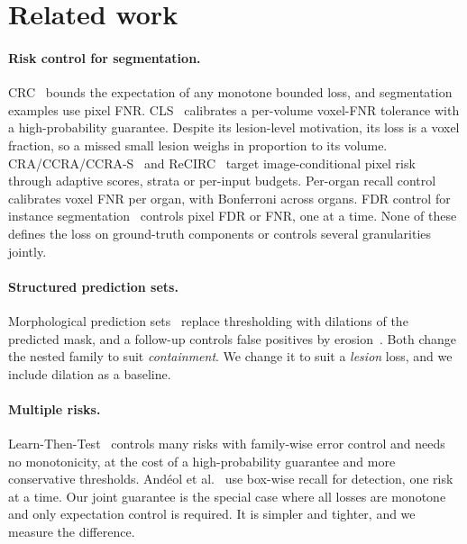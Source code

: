 \section{Related work}

\paragraph{Risk control for segmentation.}
CRC~\cite{angelopoulos2024crc} bounds the expectation of any monotone bounded
loss, and segmentation examples use pixel FNR. CLS~\cite{tan2025cls} calibrates
a per-volume voxel-FNR tolerance with a high-probability guarantee. Despite its
lesion-level motivation, its loss is a voxel fraction, so a missed small lesion
weighs in proportion to its volume. CRA/CCRA/CCRA-S~\cite{luo2025ccra} and
ReCIRC~\cite{recirc2026} target image-conditional pixel risk through adaptive
scores, strata or per-input budgets. Per-organ recall control~\cite{perorgan2026}
calibrates voxel FNR per organ, with Bonferroni across organs. FDR control for
instance segmentation~\cite{fdr2025} controls pixel FDR or FNR, one at a time.
None of these defines the loss on ground-truth components or controls several
granularities jointly.

\paragraph{Structured prediction sets.}
Morphological prediction sets~\cite{mossina2025morph} replace thresholding with
dilations of the predicted mask, and a follow-up controls false positives by
erosion~\cite{mossina2025fp}. Both change the nested family to suit
\emph{containment}. We change it to suit a \emph{lesion} loss, and we include
dilation as a baseline.

\paragraph{Multiple risks.}
Learn-Then-Test~\cite{angelopoulos2021ltt} controls many risks with
family-wise error control and needs no monotonicity, at the cost of a
high-probability guarantee and more conservative thresholds. Andéol et
al.~\cite{andeol2023} use box-wise recall for detection, one risk at a time.
Our joint guarantee is the special case where all losses are monotone and only
expectation control is required. It is simpler and tighter, and we measure the
difference.
